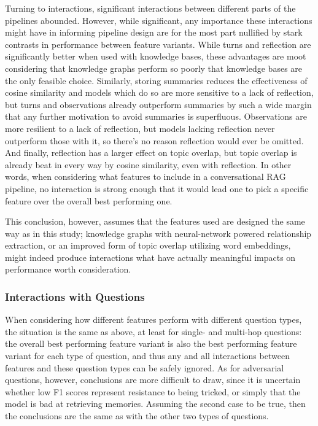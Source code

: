 Turning to interactions, significant interactions between different parts of the pipelines abounded. However, while significant, any importance these interactions might have in informing pipeline design are for the most part nullified by stark contrasts in performance between feature variants. While turns and reflection are significantly better when used with knowledge bases, these advantages are moot considering that knowledge graphs perform so poorly that knowledge bases are the only feasible choice. Similarly, storing summaries reduces the effectiveness of cosine similarity and models which do so are more sensitive to a lack of reflection, but turns and observations already outperform summaries by such a wide margin that any further motivation to avoid summaries is superfluous. Observations are more resilient to a lack of reflection, but models lacking reflection never outperform those with it, so there's no reason reflection would ever be omitted. And finally, reflection has a larger effect on topic overlap, but topic overlap is already beat in every way by cosine similarity, even with reflection. In other words, when considering what features to include in a conversational RAG pipeline, no interaction is strong enough that it would lead one to pick a specific feature over the overall best performing one.

This conclusion, however, assumes that the features used are designed the same way as in this study; knowledge graphs with neural-network powered relationship extraction, or an improved form of topic overlap utilizing word embeddings, might indeed produce interactions what have actually meaningful impacts on performance worth consideration.


\subsubsection{Interactions with Questions}

When considering how different features perform with different question types, the situation is the same as above, at least for single- and multi-hop questions: the overall best performing feature variant is also the best performing feature variant for each type of question, and thus any and all interactions between features and these question types can be safely ignored. As for adversarial questions, however, conclusions are more difficult to draw, since it is uncertain whether low F1 scores represent resistance to being tricked, or simply that the model is bad at retrieving memories. Assuming the second case to be true, then the conclusions are the same as with the other two types of questions.


